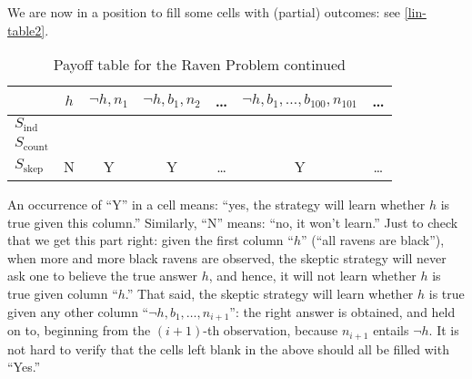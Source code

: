 We are now in a position to fill some cells with (partial) outcomes: see \autoref{lin-table2}.
\begin{table}[ht]
\centering
\begin{tabular}{lcccccc}
	& $h$ & $\neg h, n_1$ & $\neg h, b_1, n_2$ & \ldots & $\neg h, b_1, \ldots, b_{100}, n_{101}$ & \ldots \\
	\hline\hline
  	$S_{\textrm{ind}}$ &&&&&& \\
  	$S_{\textrm{count}}$ &&&&&& \\
	$S_{\textrm{skep}}$ & N & Y & Y & \ldots & Y & \ldots
\end{tabular}
\caption{Payoff table for the Raven Problem continued}\label{lin-table2}
\end{table}
An occurrence of ``Y'' in a cell means: ``yes, the strategy will learn whether $h$ is true given this column.'' Similarly, ``N'' means: ``no, it won't learn.'' Just to check that we get this part right: given the first column ``$h$'' (``all ravens are black''), when more and more black ravens are observed, the skeptic strategy will never ask one to believe the true answer $h$, and hence, it will not learn whether $h$ is true given column ``$h$.'' That said, the skeptic strategy will learn whether $h$ is true given any other column ``$\neg h, b_1, \ldots, n_{i+1}$'': the right answer is obtained, and held on to, beginning from the $(i+1)$-th observation, because $n_{i+1}$ entails $\neg h$. It is not hard to verify that the cells left blank in the above should all be filled with ``Yes.''

